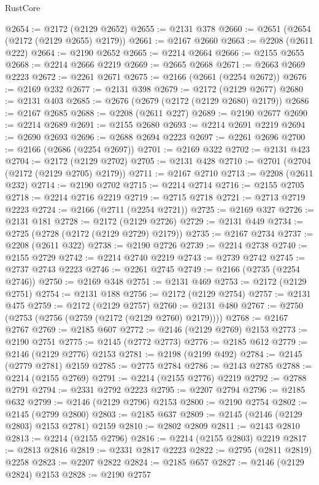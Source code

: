\begin{lexlean}{RustCore}
\begin{coremodule}
@2654 := @2172 (@2129 @2652)
@2655 := @2131 @378
@2660 := @2651 (@2654 (@2172 (@2129 @2655) @2179))
@2661 := @2167 @2660
@2663 := @2208 (@2611 @222)
@2664 := @2190 @2652
@2665 := @2214 @2664
@2666 := @2155 @2655
@2668 := @2214 @2666 @2219
@2669 := @2665 @2668
@2671 := @2663 @2669 @2223
@2672 := @2261 @2671
@2675 := @2166 (@2661 (@2254 @2672))
@2676 := @2169 @232
@2677 := @2131 @398
@2679 := @2172 (@2129 @2677)
@2680 := @2131 @403
@2685 := @2676 (@2679 (@2172 (@2129 @2680) @2179))
@2686 := @2167 @2685
@2688 := @2208 (@2611 @227)
@2689 := @2190 @2677
@2690 := @2214 @2689
@2691 := @2155 @2680
@2693 := @2214 @2691 @2219
@2694 := @2690 @2693
@2696 := @2688 @2694 @2223
@2697 := @2261 @2696
@2700 := @2166 (@2686 (@2254 @2697))
@2701 := @2169 @322
@2702 := @2131 @423
@2704 := @2172 (@2129 @2702)
@2705 := @2131 @428
@2710 := @2701 (@2704 (@2172 (@2129 @2705) @2179))
@2711 := @2167 @2710
@2713 := @2208 (@2611 @232)
@2714 := @2190 @2702
@2715 := @2214 @2714
@2716 := @2155 @2705
@2718 := @2214 @2716 @2219
@2719 := @2715 @2718
@2721 := @2713 @2719 @2223
@2724 := @2166 (@2711 (@2254 @2721))
@2725 := @2169 @327
@2726 := @2131 @181
@2728 := @2172 (@2129 @2726)
@2729 := @2131 @449
@2734 := @2725 (@2728 (@2172 (@2129 @2729) @2179))
@2735 := @2167 @2734
@2737 := @2208 (@2611 @322)
@2738 := @2190 @2726
@2739 := @2214 @2738
@2740 := @2155 @2729
@2742 := @2214 @2740 @2219
@2743 := @2739 @2742
@2745 := @2737 @2743 @2223
@2746 := @2261 @2745
@2749 := @2166 (@2735 (@2254 @2746))
@2750 := @2169 @348
@2751 := @2131 @469
@2753 := @2172 (@2129 @2751)
@2754 := @2131 @188
@2756 := @2172 (@2129 @2754)
@2757 := @2131 @475
@2759 := @2172 (@2129 @2757)
@2760 := @2131 @480
@2767 := @2750 (@2753 (@2756 (@2759 (@2172 (@2129 @2760) @2179))))
@2768 := @2167 @2767
@2769 := @2185 @607
@2772 := @2146 (@2129 @2769) @2153
@2773 := @2190 @2751
@2775 := @2145 (@2772 @2773)
@2776 := @2185 @612
@2779 := @2146 (@2129 @2776) @2153
@2781 := @2198 (@2199 @492)
@2784 := @2145 (@2779 @2781) @2159
@2785 := @2775 @2784
@2786 := @2143 @2785
@2788 := @2214 (@2155 @2769)
@2791 := @2214 (@2155 @2776) @2219
@2792 := @2788 @2791
@2794 := @2331 @2792 @2223
@2795 := @2207 @2794
@2796 := @2185 @632
@2799 := @2146 (@2129 @2796) @2153
@2800 := @2190 @2754
@2802 := @2145 (@2799 @2800)
@2803 := @2185 @637
@2809 := @2145 (@2146 (@2129 @2803) @2153 @2781) @2159
@2810 := @2802 @2809
@2811 := @2143 @2810
@2813 := @2214 (@2155 @2796)
@2816 := @2214 (@2155 @2803) @2219
@2817 := @2813 @2816
@2819 := @2331 @2817 @2223
@2822 := @2795 (@2811 @2819) @2258
@2823 := @2207 @2822
@2824 := @2185 @657
@2827 := @2146 (@2129 @2824) @2153
@2828 := @2190 @2757

\end{coremodule}
\end{lexlean}
